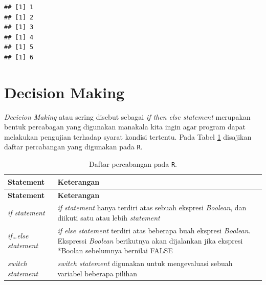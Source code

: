 \documentclass[]{book}
\begin{document}
\begin{verbatim}
## [1] 1
## [1] 2
## [1] 3
## [1] 4
## [1] 5
## [1] 6
\end{verbatim}

\section{Decision Making}\label{decision-making}

\emph{Decicion Making} atau sering disebut sebagai \emph{if then else
statement} merupakan bentuk percabagan yang digunakan manakala kita
ingin agar program dapat melakukan pengujian terhadap syarat kondisi
tertentu. Pada Tabel \ref{tab:percabangan} disajikan daftar percabangan
yang digunakan pada \texttt{R}.

\begin{longtable}[]{@{}ll@{}}
\caption{\label{tab:percabangan} Daftar percabangan pada
\texttt{R}.}\tabularnewline
\toprule
\begin{minipage}[b]{0.15\columnwidth}\raggedright\strut
\textbf{Statement}\strut
\end{minipage} & \begin{minipage}[b]{0.79\columnwidth}\raggedright\strut
\textbf{Keterangan}\strut
\end{minipage}\tabularnewline
\midrule
\endfirsthead
\toprule
\begin{minipage}[b]{0.15\columnwidth}\raggedright\strut
\textbf{Statement}\strut
\end{minipage} & \begin{minipage}[b]{0.79\columnwidth}\raggedright\strut
\textbf{Keterangan}\strut
\end{minipage}\tabularnewline
\midrule
\endhead
\begin{minipage}[t]{0.15\columnwidth}\raggedright\strut
\emph{if statement}\strut
\end{minipage} & \begin{minipage}[t]{0.79\columnwidth}\raggedright\strut
\emph{if statement} hanya terdiri atas sebuah ekspresi \emph{Boolean},
dan diikuti satu atau lebih \emph{statement}\strut
\end{minipage}\tabularnewline
\begin{minipage}[t]{0.15\columnwidth}\raggedright\strut
\emph{if\ldots{}else statement}\strut
\end{minipage} & \begin{minipage}[t]{0.79\columnwidth}\raggedright\strut
\emph{if else statement} terdiri atas beberapa buah ekspresi
\emph{Boolean}. Ekspressi \emph{Boolean} berikutnya akan dijalankan jika
ekspresi *Boolan sebelumnya bernilai FALSE\strut
\end{minipage}\tabularnewline
\begin{minipage}[t]{0.15\columnwidth}\raggedright\strut
\emph{switch statement}\strut
\end{minipage} & \begin{minipage}[t]{0.79\columnwidth}\raggedright\strut
\emph{switch statement} digunakan untuk mengevaluasi sebuah variabel
beberapa pilihan\strut
\end{minipage}\tabularnewline
\bottomrule
\end{longtable}
\end{document}
